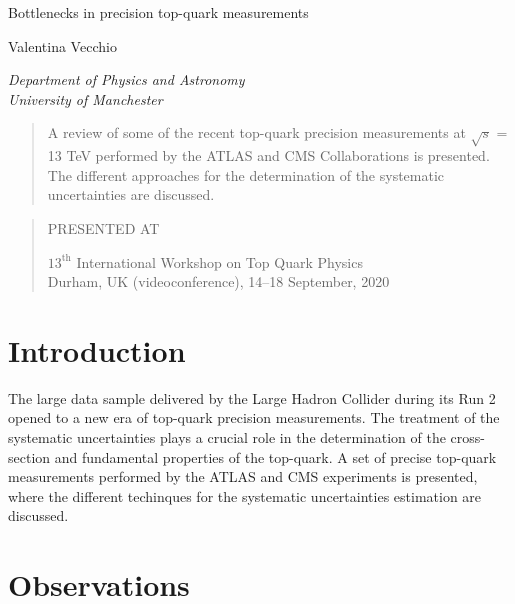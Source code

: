 \documentclass[12pt]{article}
\newcommand\pubnumber{SNSN-323-63}
\newcommand\pubdate{\today}
\def\institute{Department of Physics and Astronomy\\ University of Manchester}
\def\Title#1{\begin{center} {\Large #1 } \end{center}}
\def\Author#1{\begin{center}{ \sc #1} \end{center}}
\def\Address#1{\begin{center}{ \it #1} \end{center}}
\newcommand\pubblock{\rightline{\begin{tabular}{l} \pubnumber\\
         \pubdate  \end{tabular}}}
\newenvironment{Abstract}{\begin{quotation}  }{\end{quotation}}
\newenvironment{Presented}{\begin{quotation} \begin{center} 
             PRESENTED AT\end{center}\bigskip 
      \begin{center}\begin{large}}{\end{large}\end{center} \end{quotation}}
\begin{document}
\begin{titlepage}
\pubblock

\vfill
\Title{Bottlenecks in precision top-quark measurements}
\vfill
\Author{ Valentina Vecchio}
\Address{\institute}
\vfill
\begin{Abstract}


A review of some of the recent top-quark precision measurements at $\sqrt{s}$ = 13 TeV performed by the ATLAS and CMS Collaborations is presented. The different approaches for the determination of the systematic uncertainties are discussed. 


\end{Abstract}
\vfill
\begin{Presented}
$13^\mathrm{th}$ International Workshop on Top Quark Physics\\
Durham, UK (videoconference), 14--18 September, 2020
\end{Presented}
\vfill
\end{titlepage}
\def\thefootnote{\fnsymbol{footnote}}
\setcounter{footnote}{0}
%

\section{Introduction}
The large data sample delivered by the Large Hadron Collider during its Run 2 opened to a new era of top-quark precision measurements. The treatment of the systematic uncertainties plays a crucial role in the determination of the cross-section and fundamental properties of the top-quark. A set of precise top-quark measurements performed by the ATLAS and CMS experiments is presented, where the different techinques for the systematic uncertainties estimation are discussed.

\section{Observations}
\end{document}
